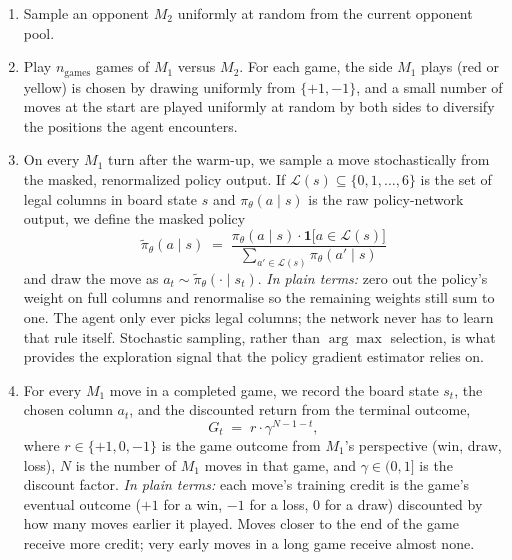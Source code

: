 \documentclass[11pt]{article}
\begin{document}
\begin{enumerate}
    \item Sample an opponent $M_2$ uniformly at random from the current
    opponent pool.

    \item Play $n_\text{games}$ games of $M_1$ versus $M_2$. For each game,
    the side $M_1$ plays (red or yellow) is chosen by drawing uniformly from
    $\{+1, -1\}$, and a small number of moves at the start are played
    uniformly at random by both sides to diversify the positions the agent
    encounters.

    \item On every $M_1$ turn after the warm-up, we sample a move
    stochastically from the masked, renormalized policy output. If
    $\mathcal{L}(s) \subseteq \{0, 1, \ldots, 6\}$ is the set of legal
    columns in board state $s$ and $\pi_\theta(a \mid s)$ is the raw
    policy-network output, we define the masked policy
    \[
        \tilde{\pi}_\theta(a \mid s)
        \;=\;
        \frac{\pi_\theta(a \mid s) \cdot \mathbf{1}\!\bigl[a \in \mathcal{L}(s)\bigr]}
             {\sum_{a' \in \mathcal{L}(s)} \pi_\theta(a' \mid s)}
    \]
    and draw the move as $a_t \sim \tilde{\pi}_\theta(\cdot \mid s_t)$.
    \textit{In plain terms:} zero out the policy's weight on full
    columns and renormalise so the remaining weights still sum to
    one. The agent only ever picks legal columns; the network never
    has to learn that rule itself.
    Stochastic sampling, rather than $\arg\max$ selection, is what provides
    the exploration signal that the policy gradient estimator relies on.

    \item For every $M_1$ move in a completed game, we record the board state
    $s_t$, the chosen column $a_t$, and the discounted return from the
    terminal outcome,
    \[
        G_t \;=\; r \cdot \gamma^{N - 1 - t},
    \]
    where $r \in \{+1, 0, -1\}$ is the game outcome from $M_1$'s perspective
    (win, draw, loss), $N$ is the number of $M_1$ moves in that game, and
    $\gamma \in (0, 1]$ is the discount factor.
    \textit{In plain terms:} each move's training credit is the
    game's eventual outcome ($+1$ for a win, $-1$ for a loss, $0$ for
    a draw) discounted by how many moves earlier it played. Moves
    closer to the end of the game receive more credit; very early
    moves in a long game receive almost none.


\end{enumerate}
\end{document}
